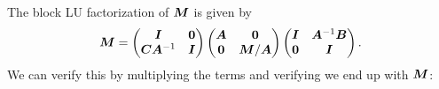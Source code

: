 \documentclass[twoside,10pt]{article}
\begin{document}
  \quad The block LU factorization of $\bm{M}$ is given by 
  \begin{equation*}
    \bm{M} = 
    \begin{pmatrix}
      \bm{I} & \bm{0} \\
      \bm{C} \bm{A}^{-1} & \bm{I}
    \end{pmatrix}
    \begin{pmatrix}
      \bm{A} & \bm{0} \\
      \bm{0} & \bm{M} / \bm{A}
    \end{pmatrix}
    \begin{pmatrix}
      \bm{I} & \bm{A}^{-1} \bm{B} \\
      \bm{0} & \bm{I}
    \end{pmatrix}.
  \end{equation*}
  \quad We can verify this by multiplying the terms and verifying we end up with $\bm{M}$:
\end{document}

